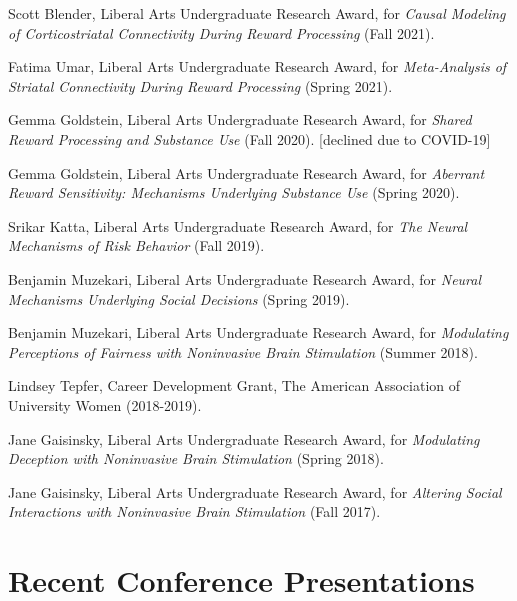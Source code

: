 \documentclass[11pt, letterpaper]{article}
\begin{document}
\begin{hangparas}{.5in}{1}
Scott Blender, Liberal Arts Undergraduate Research Award, for \textit{Causal Modeling of Corticostriatal Connectivity During Reward Processing} (Fall 2021).

Fatima Umar, Liberal Arts Undergraduate Research Award, for \textit{Meta-Analysis of Striatal Connectivity During Reward Processing} (Spring 2021).

Gemma Goldstein, Liberal Arts Undergraduate Research Award, for \textit{Shared Reward Processing and Substance Use} (Fall 2020). [declined due to COVID-19]

Gemma Goldstein, Liberal Arts Undergraduate Research Award, for \textit{Aberrant Reward Sensitivity: Mechanisms Underlying Substance Use} (Spring 2020). 

Srikar Katta, Liberal Arts Undergraduate Research Award, for \textit{The Neural Mechanisms of Risk Behavior} (Fall 2019).

Benjamin Muzekari, Liberal Arts Undergraduate Research Award, for \textit{Neural Mechanisms Underlying Social Decisions} (Spring 2019).

Benjamin Muzekari, Liberal Arts Undergraduate Research Award, for \textit{Modulating Perceptions of Fairness with Noninvasive Brain Stimulation} (Summer 2018).

Lindsey Tepfer, Career Development Grant, The American Association of University Women (2018-2019).

Jane Gaisinsky, Liberal Arts Undergraduate Research Award, for \textit{Modulating Deception with Noninvasive Brain Stimulation} (Spring 2018).

Jane Gaisinsky, Liberal Arts Undergraduate Research Award, for \textit{Altering Social Interactions with Noninvasive Brain Stimulation} (Fall 2017). \\

\end{hangparas}




\section*{Recent Conference Presentations}
\label{sec:conferences}
\end{document}
